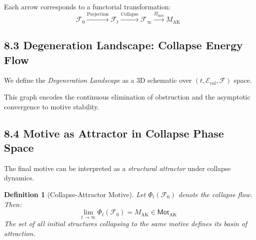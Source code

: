 \documentclass[11pt]{article}
\newtheorem{definition}[theorem]{Definition}
\begin{document}
Each arrow corresponds to a functorial transformation:
\[
\mathcal{F}_0 \xrightarrow{\text{Projection}} \mathcal{F}_t \xrightarrow{\text{Collapse}} \mathcal{F}_{\infty} \xrightarrow{\Pi_{\mathrm{mot}}} M_{\mathrm{AK}}
\]

\subsection{8.3 Degeneration Landscape: Collapse Energy Flow}

We define the \emph{Degeneration Landscape} as a 3D schematic over $(t, \mathcal{E}_{\mathrm{col}}, \mathcal{F})$ space.

\vspace{1em}
\begin{center}
\end{center}
\vspace{1em}

This graph encodes the continuous elimination of obstruction and the asymptotic convergence to motive stability.

\subsection{8.4 Motive as Attractor in Collapse Phase Space}

The final motive can be interpreted as a \textit{structural attractor} under collapse dynamics.

\begin{definition}[Collapse-Attractor Motive]
Let $\Phi_t(\mathcal{F}_0)$ denote the collapse flow. Then:
\[
\lim_{t \to \infty} \Phi_t(\mathcal{F}_0) = M_{\mathrm{AK}} \in \mathsf{Mot}_{\mathrm{AK}}
\]
The set of all initial structures collapsing to the same motive defines its basin of attraction.
\end{definition}
\end{document}
